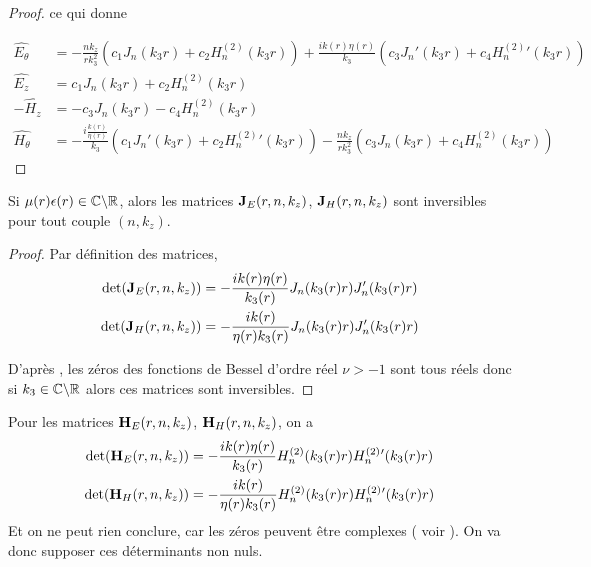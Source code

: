 \begin{proof}
      ce qui donne

       \begin{align*}
        \hat{E_\theta} &= -\frac{nk_z}{rk_3^2}\left(c_1J_n(k_3r) + c_2 H_n^{(2)}(k_3r)\right) + \frac{ik(r)\eta(r)}{k_3}\left(c_3J_n'(k_3r) + c_4 H_n^{(2)}{}'(k_3r)\right)
        \\
        \hat{E_z} &= c_1 J_n(k_3 r) + c_2 H_n^{(2)}(k_3 r)
        \\
        -\hat{H_z} &= -c_3 J_n(k_3 r) - c_4 H_n^{(2)}(k_3 r)
        \\
        \hat{H_\theta} &= -\frac{i\frac{k(r)}{\eta(r)}}{k_3}\left(c_1J_n'(k_3r) + c_2 H_n^{(2)}{}'(k_3r)\right) - \frac{nk_z}{rk_3^2}\left(c_3J_n(k_3r) + c_4 H_n^{(2)}(k_3r)\right)
      \end{align*}
    \end{proof}

    \begin{prop}
      \label{lem:cylindre:imp:inv_matrices_JE-HE}
      Si \(\mu(r)\epsilon(r) \in \mathbb C\backslash\mathbb R\), alors les matrices \(\mathbf{J}_E(r,n,k_z)\), \(\mathbf{J}_H(r,n,k_z)\)  sont inversibles pour tout couple \((n,k_z)\).
    \end{prop}

    \begin{proof}
      Par définition des matrices,
      \begin{align*}
        \det(\mathbf{J}_E(r,n,k_z)) &= -\dfrac{ik(r)\eta(r)}{k_3(r)}J_n(k_3(r)r)J_n'(k_3(r)r)
        \\
        \det(\mathbf{J}_H(r,n,k_z)) &= -\dfrac{ik(r)}{\eta(r)k_3(r)}J_n(k_3(r)r)J_n'(k_3(r)r)
      \end{align*}

      D’après \cite[p.~370]{abramowitz_handbook_1964}, les zéros des fonctions de Bessel d'ordre réel \(\nu >-1\) sont tous réels donc si \(k_3 \in\mathbb C\backslash\mathbb R\) alors ces matrices sont inversibles.
    \end{proof}


    Pour les matrices \(\mathbf{H}_E(r,n,k_z)\), \(\mathbf{H}_H(r,n,k_z)\), on a
    \begin{align*}
      \det(\mathbf{H}_E(r,n,k_z)) &= -\dfrac{ik(r)\eta(r)}{k_3(r)}H_n^{(2)}(k_3(r)r)H_n^{(2)}{}'(k_3(r)r)
      \\
      \det(\mathbf{H}_H(r,n,k_z)) &= -\dfrac{ik(r)}{\eta(r)k_3(r)}H_n^{(2)}(k_3(r)r)H_n^{(2)}{}'(k_3(r)r)
     \end{align*}
    Et on ne peut rien conclure, car les zéros peuvent être complexes ( voir \cite{sandstrom_note_2007} ). On va donc supposer ces déterminants non nuls.


